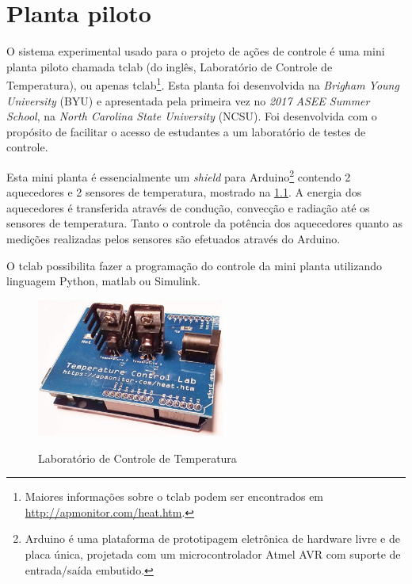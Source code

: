 
\chapter{Planta piloto}
\label{ch:planta_piloto}

O sistema experimental usado para o projeto de ações de controle é uma mini planta piloto chamada \acrlong{tclab}
(do inglês, Laboratório de Controle de Temperatura), ou apenas \acrshort{tclab}\footnote{                       %
    Maiores informações sobre o \acrshort{tclab} podem ser encontrados em \href{http://apmonitor.com/heat.htm}{http://apmonitor.com/heat.htm}.
}. Esta planta foi desenvolvida na \textit{Brigham Young University} (BYU) e apresentada pela primeira vez no
\textit{2017 ASEE Summer School}, na \textit{North Carolina State University} (NCSU). Foi desenvolvida com o
propósito de facilitar o acesso de estudantes a um laboratório de testes de controle.

Esta mini planta é essencialmente um \textit{shield} para Arduino\footnote{
    Arduino é uma plataforma de prototipagem eletrônica de hardware livre e de placa única, projetada com um    %
    microcontrolador Atmel AVR com suporte de entrada/saída embutido.                                           %
} contendo 2 aquecedores e 2 sensores de temperatura, mostrado na \cref{fig:tclab}. A energia dos aquecedores é
transferida através de condução, convecção e radiação até os sensores de temperatura. Tanto o controle da
potência dos aquecedores quanto as medições realizadas pelos sensores são efetuados através do Arduino.

O \acrshort{tclab} possibilita fazer a programação do controle da mini planta utilizando linguagem Python,
\acrshort{matlab} ou Simulink.

\begin{figure}[h]
	\caption{Laboratório de Controle de Temperatura}
	\begin{center}
		\includegraphics[width=0.55\textwidth]{./5_images/tclab.png} 
		\label{fig:tclab}
	\end{center}
	\centering
\end{figure}

